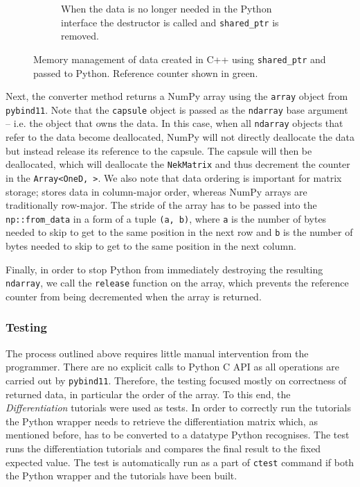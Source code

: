 \begin{figure}[h!]
\begin{subfigure}{0.6\textwidth}
        \caption{When the data is no longer needed in the Python interface the destructor is 
        called and \texttt{shared\_ptr} is removed.}
        \label{fig:c_to_python_d}
    \end{subfigure}
    \caption{Memory management of data created in C++ using \texttt{shared\_ptr} and passed 
    to Python. Reference counter shown in green.}
    \label{fig:c_to_python}
\end{figure}

Next, the converter method returns a NumPy array using the \texttt{array} object
from \texttt{pybind11}. Note that the \texttt{capsule} object is passed as the
\texttt{ndarray} base argument -- i.e. the object that owns the data. In this
case, when all \texttt{ndarray} objects that refer to the data become
deallocated, NumPy will not directly deallocate the data but instead release its
reference to the capsule. The capsule will then be deallocated, which will
deallocate the \texttt{NekMatrix} and thus decrement the counter in the
\texttt{Array<OneD, >}. We also note that data ordering is important for matrix
storage; \nek{} stores data in column-major order, whereas NumPy arrays are
traditionally row-major.  The stride of the array has to be passed into the
\texttt{np::from\_data} in a form of a tuple \texttt{(a, b)}, where \texttt{a}
is the number of bytes needed to skip to get to the same position in the next
row and \texttt{b} is the number of bytes needed to skip to get to the same
position in the next column.

Finally, in order to stop Python from immediately destroying the resulting
\texttt{ndarray}, we call the \texttt{release} function on the array, which
prevents the reference counter from being decremented when the array is
returned.

\subsubsection{Testing}

The process outlined above requires little manual intervention from the
programmer. There are no explicit calls to Python C API as all operations are
carried out by \texttt{pybind11}. Therefore, the testing focused mostly on
correctness of returned data, in particular the order of the array. To this end,
the \emph{Differentiation} tutorials were used as tests. In order to correctly
run the tutorials the Python wrapper needs to retrieve the differentiation
matrix which, as mentioned before, has to be converted to a datatype Python
recognises. The test runs the differentiation tutorials and compares the final
result to the fixed expected value. The test is automatically run as a part of
\texttt{ctest} command if both the Python wrapper and the tutorials have been
built.

